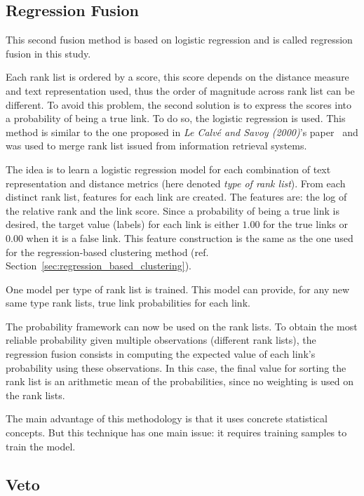 \subsection{Regression Fusion \label{sec:regression_fusion}}

This second fusion method is based on logistic regression and is called regression fusion in this study.

Each rank list is ordered by a score, this score depends on the distance measure and text representation used, thus the order of magnitude across rank list can be different.
To avoid this problem, the second solution is to express the scores into a probability of being a true link.
To do so, the logistic regression is used.
This method is similar to the one proposed in \textit{Le Calvé and Savoy (2000)}'s paper~\cite{le_calve_database_merging} and was used to merge rank list issued from information retrieval systems.

The idea is to learn a logistic regression model for each combination of text representation and distance metrics (here denoted \textit{type of rank list}).
From each distinct rank list, features for each link are created.
The features are: the log of the relative rank and the link score.
Since a probability of being a true link is desired, the target value (labels) for each link is either $1.00$ for the true links or $0.00$ when it is a false link.
This feature construction is the same as the one used for the regression-based clustering method (ref. Section~\ref{sec:regression_based_clustering}).

One model per type of rank list is trained.
This model can provide, for any new same type rank lists, true link probabilities for each link.

The probability framework can now be used on the rank lists.
To obtain the most reliable probability given multiple observations (different rank lists), the regression fusion consists in computing the expected value of each link's probability using these observations.
In this case, the final value for sorting the rank list is an arithmetic mean of the probabilities, since no weighting is used on the rank lists.

The main advantage of this methodology is that it uses concrete statistical concepts.
But this technique has one main issue: it requires training samples to train the model.

\subsection{Veto}

